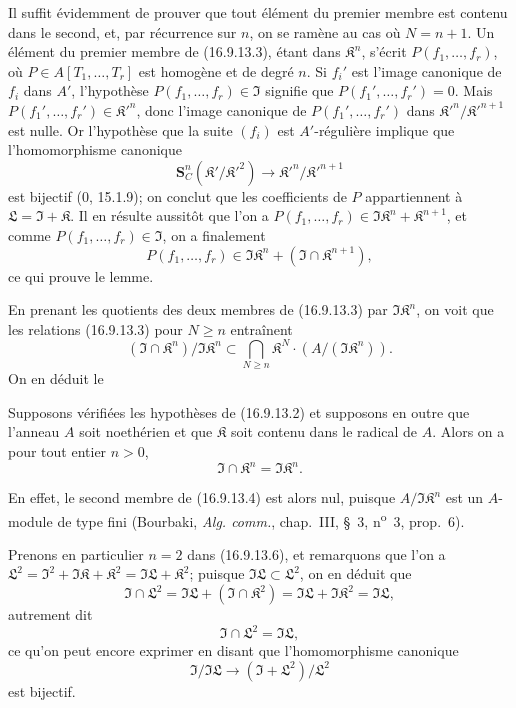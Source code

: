 Il suffit évidemment de prouver que tout élément du premier membre est
contenu dans le second, et, par récurrence sur $n$, on se ramène au cas où
$N=n+1$. Un élément du premier membre de (16.9.13.3), étant dans
$\mathfrak{K}^n$, s'écrit $P(f_1,\ldots,f_r)$, où
$P\in A[T_1,\ldots,T_r]$ est homogène et de degré $n$. Si $f_i'$ est l'image
canonique de $f_i$ dans $A'$, l'hypothèse
$P(f_1,\ldots,f_r)\in\mathfrak{I}$ signifie que
$P(f_1',\ldots,f_r')=0$. Mais
$P(f_1',\ldots,f_r')\in\mathfrak{K}'^n$, donc l'image canonique de
$P(f_1',\ldots,f_r')$ dans
$\mathfrak{K}'^n/\mathfrak{K}'^{n+1}$ est nulle. Or l'hypothèse que la suite
$(f_i)$ est $A'$-régulière implique que l'homomorphisme canonique
\[
  \mathbf{S}_C^n(\mathfrak{K}'/\mathfrak{K}'^2)
  \longrightarrow\mathfrak{K}'^n/\mathfrak{K}'^{n+1}
\]
est bijectif (0, 15.1.9); on conclut que les coefficients de $P$ appartiennent
à $\mathfrak{L}=\mathfrak{I}+\mathfrak{K}$. Il en résulte aussitôt que l'on a
$P(f_1,\ldots,f_r)\in\mathfrak{I}\mathfrak{K}^n+\mathfrak{K}^{n+1}$, et comme
$P(f_1,\ldots,f_r)\in\mathfrak{I}$, on a finalement
\[
  P(f_1,\ldots,f_r)
  \in\mathfrak{I}\mathfrak{K}^n
    +(\mathfrak{I}\cap\mathfrak{K}^{n+1}),
\]
ce qui prouve le lemme.

En prenant les quotients des deux membres de (16.9.13.3) par
$\mathfrak{I}\mathfrak{K}^n$, on voit que les relations (16.9.13.3) pour
$N\geq n$ entraînent
\[
  (\mathfrak{I}\cap\mathfrak{K}^n)/\mathfrak{I}\mathfrak{K}^n
  \subset\bigcap_{N\geq n}\mathfrak{K}^N
    \cdot(A/(\mathfrak{I}\mathfrak{K}^n)).
  \tag{16.9.13.4}
  \label{IV.16.9.13.4}
\]
On en déduit le

\begin{corollary}[16.9.13.5]
\label{IV.16.9.13.5}
Supposons vérifiées les hypothèses de (16.9.13.2) et supposons en outre que
l'anneau $A$ soit noethérien et que $\mathfrak{K}$ soit contenu dans le
radical de $A$. Alors on a pour tout entier $n>0$,
\[
  \mathfrak{I}\cap\mathfrak{K}^n=\mathfrak{I}\mathfrak{K}^n.
  \tag{16.9.13.6}
  \label{IV.16.9.13.6}
\]
\end{corollary}

En effet, le second membre de (16.9.13.4) est alors nul, puisque
$A/\mathfrak{I}\mathfrak{K}^n$ est un $A$-module de type fini (Bourbaki,
\emph{Alg. comm.}, chap.~III, §~3, n\textsuperscript{o}~3, prop.~6).

Prenons en particulier $n=2$ dans (16.9.13.6), et remarquons que l'on a
$\mathfrak{L}^2=\mathfrak{I}^2+\mathfrak{I}\mathfrak{K}+\mathfrak{K}^2
=\mathfrak{I}\mathfrak{L}+\mathfrak{K}^2$; puisque
$\mathfrak{I}\mathfrak{L}\subset\mathfrak{L}^2$, on en déduit que
\[
  \mathfrak{I}\cap\mathfrak{L}^2
  =\mathfrak{I}\mathfrak{L}+(\mathfrak{I}\cap\mathfrak{K}^2)
  =\mathfrak{I}\mathfrak{L}+\mathfrak{I}\mathfrak{K}^2
  =\mathfrak{I}\mathfrak{L},
\]
autrement dit
\[
  \mathfrak{I}\cap\mathfrak{L}^2=\mathfrak{I}\mathfrak{L},
  \tag{16.9.13.7}
  \label{IV.16.9.13.7}
\]
ce qu'on peut encore exprimer en disant que l'homomorphisme canonique
\[
  \mathfrak{I}/\mathfrak{I}\mathfrak{L}
  \longrightarrow(\mathfrak{I}+\mathfrak{L}^2)/\mathfrak{L}^2
\]
est bijectif.


